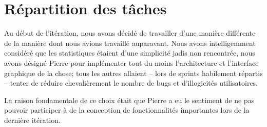 \section{Répartition des tâches}

Au début de l'itération, nous avons décidé de travailler d'une manière différente
de la manière dont nous avions travaillé auparavant. Nous avons intelligemment
considéré que les statistiques étaient d'une simplicité jadis non rencontrée,
nous avons désigné Pierre pour implémenter tout du moins l'architecture et 
l'interface graphique de la chose; tous les autres allaient -- lors de sprints
habilement répartis -- tenter de réduire chevalièrement le nombre de bugs et 
d'illogicités utilisatoires.

La raison fondamentale de ce choix était que Pierre a eu le sentiment de ne pas
pouvoir participer à de la conception de fonctionnalités importantes lors de la
dernière itération. 